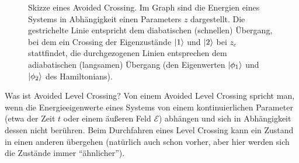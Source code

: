 \begin{figure}[H]
    \centering
    \caption{Skizze eines Avoided Crossing. Im Graph sind die Energien eines Systems in Abhängigkeit einen Parameters $z$ dargestellt. Die gestrichelte Linie entspricht dem diabatischen (schnellen) Übergang, bei dem ein Crossing der Eigenzustände $\ket{1}$ und $\ket{2}$ bei $z_c$ stattfindet, die durchgezogenen Linien entsprechen dem adiabatischen (langsamen) Übergang (den Eigenwerten $\ket{\phi_1}$ und $\ket{\phi_2}$ des Hamiltonians).}
\end{figure}

\begin{fquestion}{Was ist Avoided Level Crossing?}
    Von einem Avoided Level Crossing spricht man, wenn die Energieeigenwerte eines Systems von einem kontinuierlichen Parameter (etwa der Zeit $t$ oder einem äußeren Feld $\mathcal{E}$) abhängen und sich in Abhängigkeit dessen nicht berühren.
    Beim Durchfahren eines Level Crossing kann ein Zustand in einen anderen übergehen (natürlich auch schon vorher, aber hier werden sich die Zustände immer ``ähnlicher'').
\end{fquestion}


